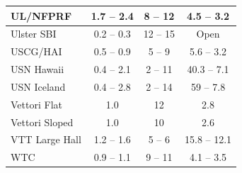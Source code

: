 \begin{table}[p]
\begin{center}
\begin{tabular}{|l|c|c|c|}
UL/NFPRF            & 1.7 -- 2.4    & 8 -- 12       & 4.5 -- 3.2    \\ \hline
Ulster SBI          & 0.2 -- 0.3    & 12 -- 15      & Open          \\ \hline
USCG/HAI            & 0.5 -- 0.9    & 5 -- 9        & 5.6 -- 3.2    \\ \hline
USN Hawaii          & 0.4 -- 2.1    & 2 -- 11       & 40.3 -- 7.1   \\ \hline
USN Iceland         & 0.4 -- 2.8    & 2 -- 14       & 59 -- 7.8     \\ \hline
Vettori Flat        & 1.0           & 12            & 2.8           \\ \hline
Vettori Sloped      & 1.0           & 10            & 2.6           \\ \hline
VTT Large Hall      & 1.2 -- 1.6    & 5 -- 6        & 15.8 -- 12.1  \\ \hline
WTC                 & 0.9 -- 1.1    & 9 -- 11       & 4.1 -- 3.5    \\ \hline
\end{tabular}
\end{center}
\label{Numerical_Parameters}
\nopagebreak
\end{table}






